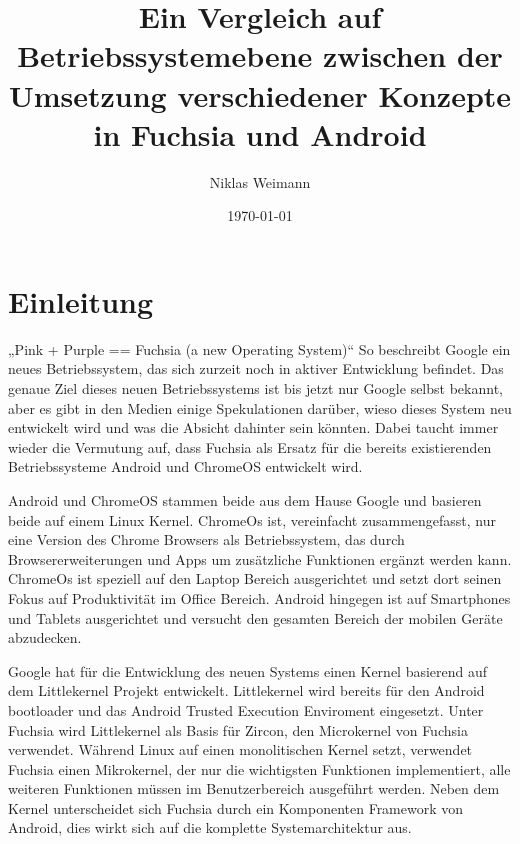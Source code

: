 \documentclass[a4paper]{scrartcl}
\begin{document}
\title{Ein Vergleich auf Betriebssystemebene zwischen der Umsetzung verschiedener Konzepte in Fuchsia und Android}
\author{Niklas Weimann}
\date{\today}

\maketitle
\tableofcontents
\newpage

\section{Einleitung}
„Pink + Purple == Fuchsia (a new Operating System)“\cite{fuchsia.Gettingstarted} So beschreibt Google ein neues Betriebssystem, das sich zurzeit noch in aktiver Entwicklung befindet. Das genaue Ziel dieses neuen Betriebssystems ist bis jetzt nur Google selbst bekannt, aber es gibt in den Medien einige Spekulationen darüber, wieso dieses System neu entwickelt wird und was die Absicht dahinter sein könnten. Dabei taucht immer wieder die Vermutung auf, dass Fuchsia als Ersatz für die bereits existierenden Betriebssysteme Android und ChromeOS entwickelt wird.

Android und ChromeOS stammen beide aus dem Hause Google und basieren beide auf einem Linux Kernel.  ChromeOs ist, vereinfacht zusammengefasst, nur eine Version des Chrome Browsers als Betriebssystem, das durch Browsererweiterungen und Apps um zusätzliche Funktionen ergänzt werden kann. ChromeOs ist speziell auf den Laptop Bereich ausgerichtet und setzt dort seinen Fokus auf Produktivität im Office Bereich. Android hingegen ist auf Smartphones und Tablets ausgerichtet und versucht den gesamten Bereich der mobilen Geräte abzudecken.

Google hat für die Entwicklung des neuen Systems einen Kernel basierend auf dem Littlekernel Projekt entwickelt. Littlekernel wird bereits für den Android bootloader \cite{Android.LittleKernel} und das Android Trusted Execution Enviroment \cite{Android.TrustyTee} eingesetzt. Unter Fuchsia wird Littlekernel als Basis für Zircon, den Microkernel von Fuchsia verwendet. Während Linux auf einen monolitischen Kernel setzt, verwendet Fuchsia einen Mikrokernel, der nur die wichtigsten Funktionen implementiert, alle weiteren Funktionen müssen im Benutzerbereich ausgeführt werden. Neben dem Kernel unterscheidet sich Fuchsia durch ein Komponenten Framework von Android, dies wirkt sich auf die komplette Systemarchitektur aus.
\end{document}
